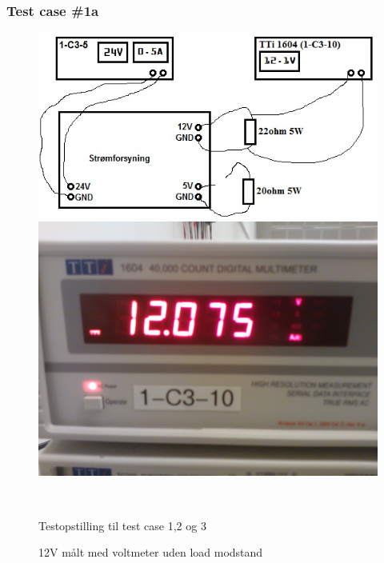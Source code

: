 \subsubsection{Test case \#1a}
\begin{figure}[htbp] \centering
\begin{minipage}[c]{0.48\textwidth} \centering
\includegraphics[width=1.00\textwidth]{billeder/test_power.jpg} 
\end{minipage} \hfill
\begin{minipage}[c]{0.48\textwidth} \centering
\includegraphics[width=1.00\textwidth]{billeder/12V_0A.jpg} 
\end{minipage} \\ 
\begin{minipage}[t]{0.48\textwidth}
\caption{Testopstilling til test case 1,2 og 3} 
\label{fig:udgang_12V_05A}
\end{minipage} \hfill
\begin{minipage}[t]{0.48\textwidth}
\caption{12V målt med voltmeter uden load modstand} 
\label{fig:forsyning_12V_05A}
\end{minipage}
\end{figure}
